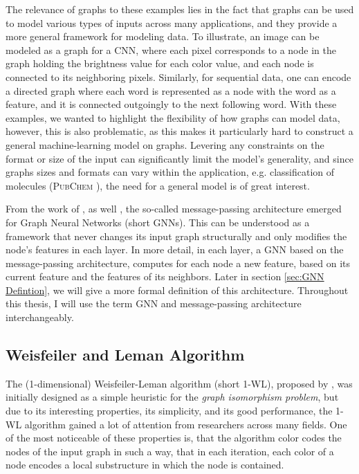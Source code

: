 \documentclass[11pt, dvipsnames, DIV=12]{scrreprt}
\theoremstyle{definition}
\begin{document}
The relevance of graphs to these examples lies in the fact that graphs can be used to model various types of inputs across many applications, and they provide a more general framework for modeling data. To illustrate, an image can be modeled as a graph for a CNN, where each pixel corresponds to a node in the graph holding the brightness value for each color value, and each node is connected to its neighboring pixels. Similarly, for sequential data, one can encode a directed graph where each word is represented as a node with the word as a feature, and it is connected outgoingly to the next following word. With these examples, we wanted to highlight the flexibility of how graphs can model data, however, this is also problematic, as this makes it particularly hard to construct a general machine-learning model on graphs. Levering any constraints on the format or size of the input can significantly limit the model's generality, and since graphs sizes and formats can vary within the application, e.g. classification of molecules (\textsc{PubChem} \cite{Mor+2020}), the need for a general model is of great interest.

From the work of \cite{Gil+2017}, as well \cite{Sca+2009}, the so-called message-passing architecture emerged for Graph Neural Networks (short GNNs). This can be understood as a framework that never changes its input graph structurally and only modifies the node's features in each layer. In more detail, in each layer, a GNN based on the message-passing architecture, computes for each node a new feature, based on its current feature and the features of its neighbors. Later in section \ref{sec:GNN Defintion}, we will give a more formal definition of this architecture.
Throughout this thesis, I will use the term GNN and message-passing architecture interchangeably.


\subsection{Weisfeiler and Leman Algorithm}
The (1-dimensional) Weisfeiler-Leman algorithm (short 1-WL), proposed by \cite{Wei+1968}, was initially designed as a simple heuristic for the \textit{graph isomorphism problem}, but due to its interesting properties, its simplicity, and its good performance, the 1-WL algorithm gained a lot of attention from researchers across many fields. One of the most noticeable of these properties is, that the algorithm color codes the nodes of the input graph in such a way, that in each iteration, each color of a node encodes a local substructure in which the node is contained.
\end{document}
